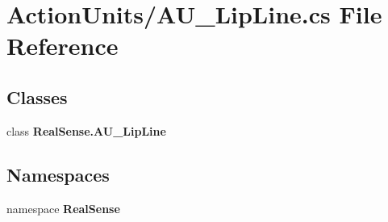 \section{Action\+Units/\+A\+U\+\_\+\+Lip\+Line.cs File Reference}
\label{_a_u___lip_line_8cs}
\subsection*{Classes}
\begin{DoxyCompactItemize}
\item 
class \textbf{ Real\+Sense.\+A\+U\+\_\+\+Lip\+Line}
\end{DoxyCompactItemize}
\subsection*{Namespaces}
\begin{DoxyCompactItemize}
\item 
namespace \textbf{ Real\+Sense}
\end{DoxyCompactItemize}
